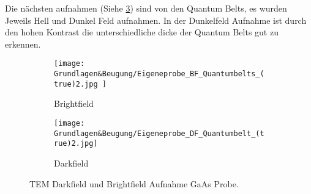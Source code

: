 Die nächsten aufnahmen (Siehe \cref{EPBF&DFQB}) sind von den Quantum Belts, es wurden Jeweils Hell und Dunkel Feld aufnahmen. In der Dunkelfeld Aufnahme ist durch den hohen Kontrast die unterschiedliche dicke der Quantum Belts gut zu erkennen. 

\begin{figure}
     \centering
     \begin{subfigure}[b]{0.49\textwidth}
         \centering
         \texttt{[image: Grundlagen\&Beugung/Eigeneprobe\_BF\_Quantumbelts\_(true)2.jpg ]}
         \caption{Brightfield}
         \label{EPBFQB}
     \end{subfigure}
     \hfill
     \begin{subfigure}[b]{0.49\textwidth}
         \centering
         \texttt{[image: Grundlagen\&Beugung/Eigeneprobe\_DF\_Quantumbelt\_(true)2.jpg]}
         \caption{Darkfield}
         \label{EPDFQB}
     \end{subfigure}
        \caption{TEM Darkfield und Brightfield Aufnahme GaAs Probe.}
        \label{EPBF&DFQB}
\end{figure}
